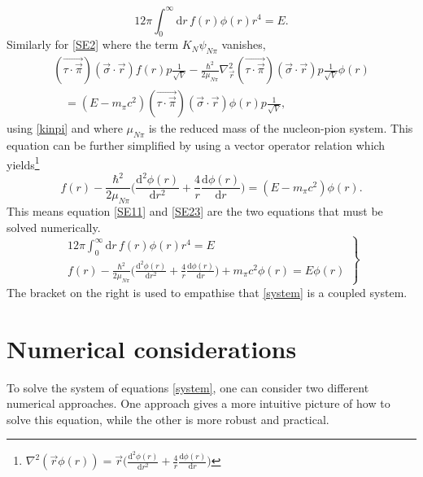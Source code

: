 \begin{equation} \label{SE11}
	12\pi \int_0^\infty  \text{d}r \, f(r) \phi(r) r^4  = E.
\end{equation}
Similarly for \eqref{SE2} where the term $K_{N}\psi_{N\pi}$ vanishes,
\begin{equation}\begin{split}\label{SE22}
		(\vec{\tau\cdot\vec{\pi}})(\vec{\sigma}\cdot\vec{r})f(r) p \frac{1}{\sqrt{V}}-\frac{\hbar^2}{2\mu_{N\pi}} \nabla^2_{\vec{r}}(\vec{\tau\cdot\vec{\pi}})(\vec{\sigma}\cdot\vec{r}) p \frac{1}{\sqrt{V}}\phi(r) \\ \quad= (E-m_\pi c^2) (\vec{\tau\cdot\vec{\pi}})(\vec{\sigma}\cdot\vec{r}) \phi(r)p\frac{1}{\sqrt{V}},
	\end{split}
\end{equation}
using \eqref{kinpi} and where $\mu_{N\pi}$ is the reduced mass of the nucleon-pion system. This equation can be further simplified by using a vector operator relation which yields\footnote{$\nabla^2(\vec{r}\phi(r))=\vec{r}\big(\frac{\text{d}^2\phi(r)}{\text{d}r^2}+\frac{4}{r}\frac{\text{d}\phi(r)}{\text{d}r}\big)$}
\begin{equation} \label{SE23}
	f(r) -\frac{\hbar^2}{2\mu_{N\pi}}\Big(\frac{\text{d}^2 \phi(r)}{\text{d}r^2}+\frac{4}{r}\frac{\text{d}\phi(r)}{\text{d}r}\Big) = (E-m_\pi c^2)\phi(r).
\end{equation}
This means equation \eqref{SE11} and \eqref{SE23} are the two equations that must be solved numerically.
\begin{equation} \label{system}
	\left.
	\begin{array}{ll}
		12\pi \int_0^\infty  \text{d}r \, f(r) \phi(r) r^4  = E \\
		f(r) -\frac{\hbar^2}{2\mu_{N\pi}}\Big(\frac{\text{d}^2 \phi(r)}{\text{d}r^2}+\frac{4}{r}\frac{\text{d}\phi(r)}{\text{d}r}\Big)+m_\pi c^2 \phi(r) = E\phi(r)
	\end{array}
	\right \} 
\end{equation}
The bracket on the right is used to empathise that \eqref{system} is a coupled system.
\section{Numerical considerations}\label{sec:numericalconsiderations}
To solve the system of equations \eqref{system}, one can consider two different numerical approaches. One approach gives a more intuitive picture of how to solve this equation, while the other is more robust and practical.

